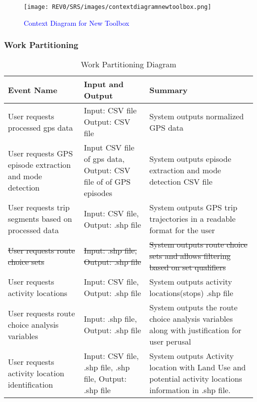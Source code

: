 \documentclass[12pt, titlepage]{article}
\begin{document}
\begin{figure}[!h]
	    \begin{center}
    	    \texttt{[image: REV0/SRS/images/contextdiagramnewtoolbox.png]}
    	    \caption{\textcolor{blue}{Context Diagram for New Toolbox}}
    	    \label{fig: Context Diagram}
    	\end{center}
\end{figure}

\subsubsection{Work Partitioning}
\begin{table}[H]
    \centering
    \begin{tabular}{|p{4cm}|p{4cm}|p{6cm}|}
         \hline
         Event Name & Input and Output & Summary\\
         \hline
         User requests processed gps data & Input: CSV file Output: CSV file & System outputs normalized GPS data\\
         \hline
         User requests GPS episode extraction and mode detection & Input CSV file of gps data, Output: CSV file of of GPS episodes & System outputs episode extraction and mode detection CSV file\\
         \hline
         User requests trip segments based on processed data & Input: CSV file, Output: .shp file & System outputs GPS trip trajectories in a readable format for the user\\
         \hline
         \sout{User requests route choice sets} & \sout{Input: .shp file, Output: .shp file} & \sout{System outputs route choice sets and allows filtering based on set qualifiers}\\
         \hline
         User requests activity locations  & Input: CSV file, Output: .shp file & System outputs activity locations(stops) .shp file\\
         \hline
         User requests route choice analysis variables  & Input: .shp file, Output: .shp file & System outputs the route choice analysis variables along with justification for user perusal \\
         \hline
          User requests activity location identification  & Input: CSV file, .shp file, .shp file, Output: .shp file& System outputs Activity location with Land Use and potential activity locations information in .shp file. \\
         \hline
    \end{tabular}
    \caption{Work Partitioning Diagram\cite{GISBASED}}
    \label{tab:work_partitioning_diagram}
\end{table}
\end{document}

